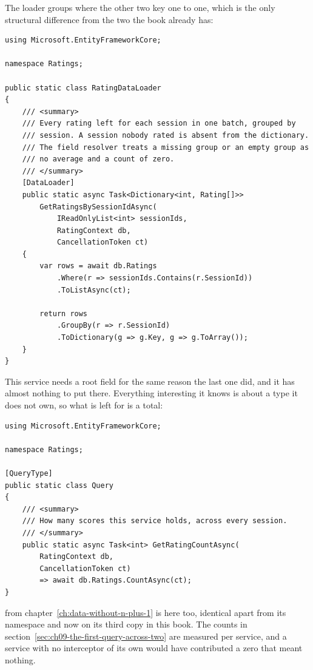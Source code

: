 %
The loader groups where the other two key one to one, which is the only structural
difference from the two the book already has:

\begin{verbatim}
using Microsoft.EntityFrameworkCore;

namespace Ratings;

public static class RatingDataLoader
{
    /// <summary>
    /// Every rating left for each session in one batch, grouped by
    /// session. A session nobody rated is absent from the dictionary.
    /// The field resolver treats a missing group or an empty group as
    /// no average and a count of zero.
    /// </summary>
    [DataLoader]
    public static async Task<Dictionary<int, Rating[]>>
        GetRatingsBySessionIdAsync(
            IReadOnlyList<int> sessionIds,
            RatingContext db,
            CancellationToken ct)
    {
        var rows = await db.Ratings
            .Where(r => sessionIds.Contains(r.SessionId))
            .ToListAsync(ct);

        return rows
            .GroupBy(r => r.SessionId)
            .ToDictionary(g => g.Key, g => g.ToArray());
    }
}
\end{verbatim}

%
This service needs a root field for the same reason the last one did, and it
has almost nothing to put there. Everything interesting it knows is about a
type it does not own, so what is left for  is a total:

\begin{verbatim}
using Microsoft.EntityFrameworkCore;

namespace Ratings;

[QueryType]
public static class Query
{
    /// <summary>
    /// How many scores this service holds, across every session.
    /// </summary>
    public static async Task<int> GetRatingCountAsync(
        RatingContext db,
        CancellationToken ct)
        => await db.Ratings.CountAsync(ct);
}
\end{verbatim}

%
 from chapter~\ref{ch:data-without-n-plus-1} is here too,
identical apart from its namespace and now on its third copy in this book. The
counts in section~\ref{sec:ch09-the-first-query-across-two} are measured per
service, and a service with no interceptor of its own would have contributed a
zero that meant nothing.

